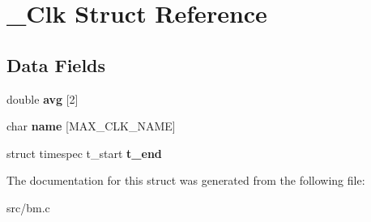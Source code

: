 \hypertarget{struct__Clk}{}\section{\+\_\+\+Clk Struct Reference}
\label{struct__Clk}
\subsection*{Data Fields}
\begin{DoxyCompactItemize}
\item 
\mbox{\label{struct__Clk_ae56775cff8bcaff5053f5a4384fad4b8}} 
double {\bfseries avg} \mbox{[}2\mbox{]}
\item 
\mbox{\label{struct__Clk_a9fce1e7d1342f307a4df9e7bd7344640}} 
char {\bfseries name} \mbox{[}M\+A\+X\+\_\+\+C\+L\+K\+\_\+\+N\+A\+ME\mbox{]}
\item 
\mbox{\label{struct__Clk_adf01b4d727bc6ef3fbb2ccd5c157e8ba}} 
struct timespec t\+\_\+start {\bfseries t\+\_\+end}
\end{DoxyCompactItemize}


The documentation for this struct was generated from the following file\+:\begin{DoxyCompactItemize}
\item 
src/bm.\+c\end{DoxyCompactItemize}
